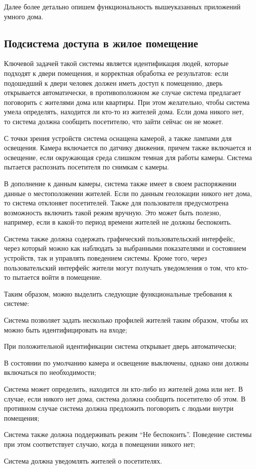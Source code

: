 Далее более детально опишем функциональность вышеуказанных приложений умного дома.

\subsection{Подсистема доступа в жилое помещение}
Ключевой задачей такой системы является идентификация людей, которые подходят к двери помещения, и корректная обработка ее результатов: если подошедший к двери человек должен иметь доступ к помещению, дверь открывается автоматически, в противоположном же случае система предлагает поговорить с жителями дома или квартиры. При этом желательно, чтобы система умела определять, находится ли кто-то из жителей дома. Если дома никого нет, то система должна сообщить посетителю, что зайти сейчас он не может.

С точки зрения устройств система оснащена камерой, а также лампами для освещения. Камера включается по датчику движения, причем также включается и освещение, если окружающая среда слишком темная для работы камеры. Система пытается распознать посетителя по снимкам с камеры.

В дополнение к данным камеры, система также имеет в своем распоряжении данные о местоположении жителей. Если по данным геолокации никого нет дома, то система отклоняет посетителей. Также для пользователя предусмотрена возможность включить такой режим вручную. Это может быть полезно, например, если в какой-то период времени жителей не должны беспокоить.

Система также должна содержать графический пользовательский интерфейс, через который можно как наблюдать за выбранными показателями и состоянием устройств, так и управлять поведением системы. Кроме того, через пользовательский интерфейс жители могут получать уведомления о том, что кто-то пытается войти в помещение.

Таким образом, можно выделить следующие функциональные требования к системе:

\begin{textitemize}
	\item Система позволяет задать несколько профилей жителей таким образом, чтобы их можно быть идентифицировать на входе;
	\item При положительной идентификации система открывает дверь автоматически;
	\item В состоянии по умолчанию камера и освещение выключены, однако они должны включаться по необходимости;
	\item Система может определить, находится ли кто-либо из жителей дома или нет. В случае, если никого нет дома, система должна сообщить посетителю об этом. В противном случае система должна предложить поговорить с людьми внутри помещения;
	\item Система также должна поддерживать режим ``Не беспокоить''. Поведение системы при этом соответствует случаю, когда в помещении никого нет;
	\item Система должна уведомлять жителей о посетителях.
\end{textitemize}


